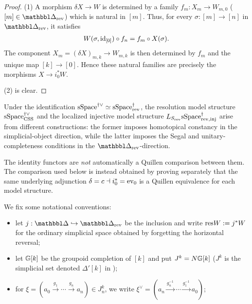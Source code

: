 \documentclass[a4paper,dvipdfmx,11pt]{amsart}
\begin{document}
\begin{proof}
  (1)
  A morphism $\delta X\to W$ is determined by a family $f_m: X_m \to W_{m,0}$ ($[m]\in\prism_{\rev}$) which is natural in $[m]$.
  Thus, for every $\sigma:[m]\to[n]$ in $\prism_{\rev}$, it satisfies
  \begin{align}
    W(\sigma,\operatorname{id}_{[0]})
    \circ
    f_n
    =
    f_m
    \circ
    X(\sigma).
  \end{align}
  The component $X_m=(\delta X)_{m,k}\to W_{m,k}$ is then determined by $f_m$ and the unique map $[k]\to[0]$.
  Hence these natural families are precisely the morphisms $X \to i_0^*W$.

  (2) is clear.
\end{proof}

\begin{remark}\label{jt.rem.two-localizations}
  Under the identification $ \mathrm{sSpace}^{\dag\vee} \simeq \mathrm{sSpace}^{\dag}_{\mathrm{rev}}$, the resolution model structure $\mathrm{sSpace}^{\dag\vee}_{\mathrm{CSS}}$ and the localized injective model structure $L_{S_{\mathrm{rev}}}\mathrm{sSpace}^{\dag}_{\mathrm{rev},\mathrm{inj}}$ arise from different constructions:
  the former imposes homotopical constancy in the simplicial-object direction, while the latter imposes the Segal and unitary-completeness conditions in the $\prism_{\rev}$-direction.

  The identity functors are \emph{not} automatically a Quillen comparison between them.
  The comparison used below is instead obtained by proving separately that the same underlying adjunction $\delta=c \dashv i_{0}^{*}=\mathrm{ev}_{0}$ is a Quillen equivalence for each model structure.
\end{remark}

\begin{notation}\label{jt.not.tdag}
  We fix some notational conventions:
  \begin{itemize}
    \item let $j:\prism\hookrightarrow\prism_{\rev}$ be the inclusion and write $\mathrm{res} W:=j^*W$ for the ordinary simplicial space obtained by forgetting the horizontal reversal;
    \item let $\mathbb{G}[k]$ be the groupoid completion of $[k]$ and put $J^k=N\mathbb{G}[k]$ ($J^k$ is the simplicial set denoted $\Delta'[k]$ in \cite[\S2]{JT06});
    \item for $\xi=(a_0\xrightarrow{g_1}\cdots\xrightarrow{g_n}a_n)\in J^k_n$, we write $\xi^\vee=(a_n\xrightarrow{g_n^{-1}}\cdots \xrightarrow{g_1^{-1}}a_0)$;
  \end{itemize}
\end{notation}
\end{document}
